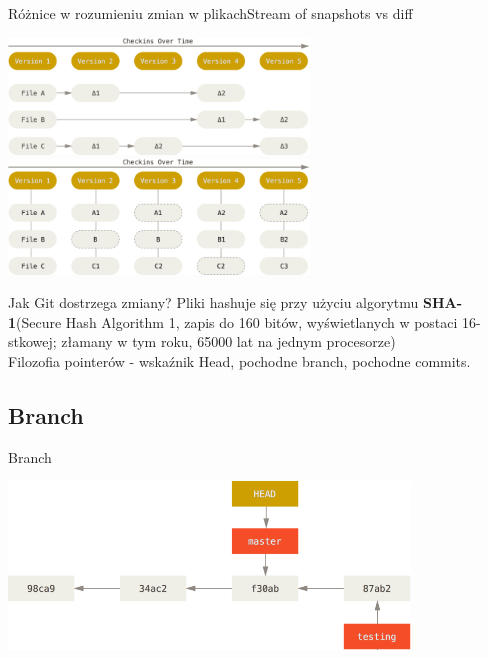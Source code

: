 \documentclass{beamer}
\begin{document}
\begin{frame}{Różnice w rozumieniu zmian w plikach}{Stream of snapshots vs diff}
  \begin{center}
   \includegraphics[width=0.6\textwidth]{./obrazki/fig-1_4.png}\\
   \includegraphics[width=0.6\textwidth]{./obrazki/fig-1_5.png}
 \end{center}

\end{frame}

\begin{frame}{Jak Git dostrzega zmiany?}
 Pliki hashuje się przy użyciu algorytmu \textbf{SHA-1}(Secure Hash Algorithm 1, zapis do 160 bitów, wyświetlanych w postaci 16-stkowej; złamany w tym roku, 65000 lat na jednym procesorze) \\
 \vspace{3mm}
 Filozofia pointerów - wskaźnik Head, pochodne branch, pochodne commits.
\end{frame}

\subsection{Branch}
\begin{frame}{Branch}
   \begin{center}
   \includegraphics[width=0.8\textwidth]{./obrazki/fig-3_8.png}
 \end{center}
\end{frame}
\end{document}
